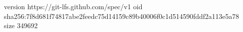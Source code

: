 version https://git-lfs.github.com/spec/v1
oid sha256:7f8d681f74817abe2feedc75d14159c89b40006f0c1d514590fddf2a113e5a78
size 349692
